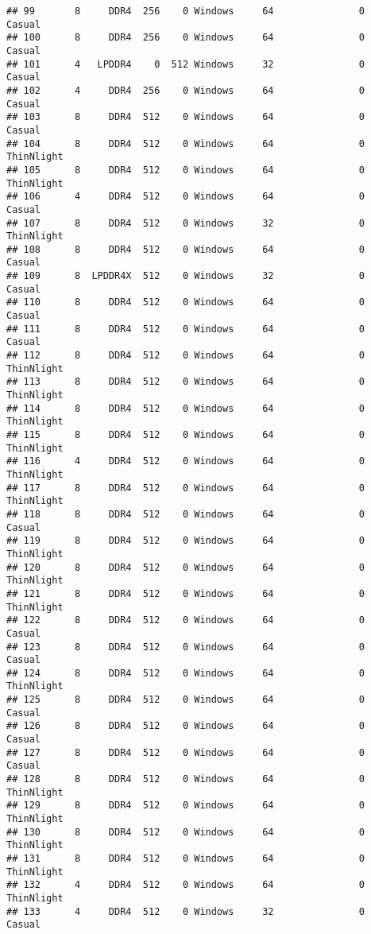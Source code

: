 \documentclass[
]{article}
\begin{document}
\begin{verbatim}
## 99       8     DDR4  256    0 Windows     64               0     Casual
## 100      8     DDR4  256    0 Windows     64               0     Casual
## 101      4   LPDDR4    0  512 Windows     32               0     Casual
## 102      4     DDR4  256    0 Windows     64               0     Casual
## 103      8     DDR4  512    0 Windows     64               0     Casual
## 104      8     DDR4  512    0 Windows     64               0 ThinNlight
## 105      8     DDR4  512    0 Windows     64               0 ThinNlight
## 106      4     DDR4  512    0 Windows     64               0     Casual
## 107      8     DDR4  512    0 Windows     32               0 ThinNlight
## 108      8     DDR4  512    0 Windows     64               0     Casual
## 109      8  LPDDR4X  512    0 Windows     32               0     Casual
## 110      8     DDR4  512    0 Windows     64               0     Casual
## 111      8     DDR4  512    0 Windows     64               0     Casual
## 112      8     DDR4  512    0 Windows     64               0 ThinNlight
## 113      8     DDR4  512    0 Windows     64               0 ThinNlight
## 114      8     DDR4  512    0 Windows     64               0 ThinNlight
## 115      8     DDR4  512    0 Windows     64               0 ThinNlight
## 116      4     DDR4  512    0 Windows     64               0 ThinNlight
## 117      8     DDR4  512    0 Windows     64               0 ThinNlight
## 118      8     DDR4  512    0 Windows     64               0     Casual
## 119      8     DDR4  512    0 Windows     64               0 ThinNlight
## 120      8     DDR4  512    0 Windows     64               0 ThinNlight
## 121      8     DDR4  512    0 Windows     64               0 ThinNlight
## 122      8     DDR4  512    0 Windows     64               0     Casual
## 123      8     DDR4  512    0 Windows     64               0     Casual
## 124      8     DDR4  512    0 Windows     64               0 ThinNlight
## 125      8     DDR4  512    0 Windows     64               0     Casual
## 126      8     DDR4  512    0 Windows     64               0     Casual
## 127      8     DDR4  512    0 Windows     64               0     Casual
## 128      8     DDR4  512    0 Windows     64               0 ThinNlight
## 129      8     DDR4  512    0 Windows     64               0 ThinNlight
## 130      8     DDR4  512    0 Windows     64               0 ThinNlight
## 131      8     DDR4  512    0 Windows     64               0 ThinNlight
## 132      4     DDR4  512    0 Windows     64               0 ThinNlight
## 133      4     DDR4  512    0 Windows     32               0     Casual

\end{verbatim}
\end{document}
